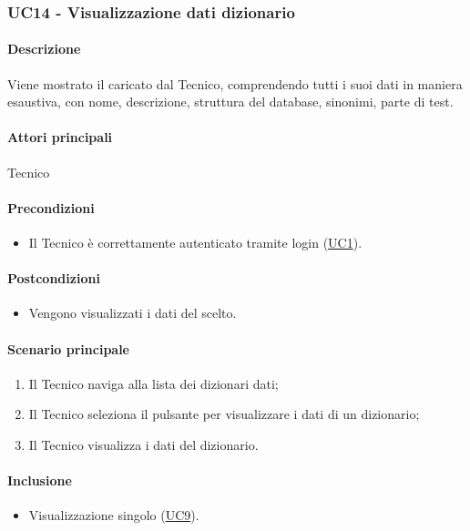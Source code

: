 \subsubsection{UC14 - Visualizzazione dati dizionario}\label{UC14}
\paragraph*{Descrizione}
Viene mostrato il  caricato dal Tecnico, comprendendo tutti i suoi dati in maniera esaustiva, con nome, descrizione, struttura del database, sinonimi, parte di test.

\paragraph*{Attori principali}
Tecnico

\paragraph*{Precondizioni}
\begin{itemize}
  \item Il Tecnico è correttamente autenticato tramite login (\hyperref[UC1]{UC1}).
\end{itemize}

\paragraph*{Postcondizioni}
\begin{itemize}
  \item Vengono visualizzati i dati del  scelto.
\end{itemize}

\paragraph*{Scenario principale}
\begin{enumerate}
  \item Il Tecnico naviga alla lista dei dizionari dati;
  \item Il Tecnico seleziona il pulsante per visualizzare i dati di un dizionario;
  \item Il Tecnico visualizza i dati del dizionario.
\end{enumerate}

\paragraph*{Inclusione}
\begin{itemize}
  \item Visualizzazione singolo  (\hyperref[UC9]{UC9}).
\end{itemize}

